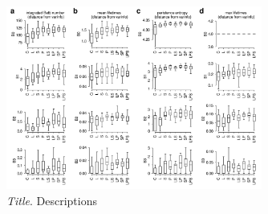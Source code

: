 \begin{figure}[H]
    \centering
    \includegraphics[width=0.75\textwidth,center]{../figures/report/Fig6.png}
    \caption{\label{fig:6}
    \textit{Title}.
    Descriptions
    }
\end{figure}